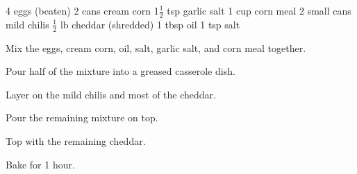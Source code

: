 \dishtype{\main}
\dishother{\vegetarian}
\begin{ingreds}
    4 eggs (beaten)
    2 cans cream corn
    1$\frac{1}{2}$ tsp garlic salt
    1 cup corn meal
    2 small cans mild chilis
    $\frac{1}{2}$ lb cheddar (shredded)
    1 tbsp oil
    1 tsp salt
\end{ingreds}
\begin{method}
    Mix the eggs, cream corn, oil, salt, garlic salt, and corn meal together.\par
    Pour half of the mixture into a greased casserole dish.\par
    Layer on the mild chilis and most of the cheddar.\par
    Pour the remaining mixture on top.\par
    Top with the remaining cheddar.\par
    Bake for 1 hour.
\end{method}